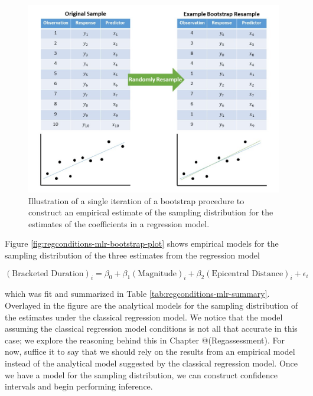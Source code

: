 \documentclass[]{book}
\theoremstyle{definition}
\theoremstyle{definition}
\theoremstyle{definition}
\theoremstyle{remark}
\begin{document}
\begin{figure}

{\centering \includegraphics[width=0.8\linewidth]{./images/RegConditions-Bootstrap} 

}

\caption{Illustration of a single iteration of a bootstrap procedure to construct an empirical estimate of the sampling distribution for the estimates of the coefficients in a regression model.}\label{fig:regconditions-bootstrap}
\end{figure}

Figure \ref{fig:regconditions-mlr-bootstrap-plot} shows empirical models
for the sampling distribution of the three estimates from the regression
model

\[(\text{Bracketed Duration})_i = \beta_0 + \beta_1(\text{Magnitude})_i + \beta_2(\text{Epicentral Distance})_i + \epsilon_i\]

which was fit and summarized in Table
\ref{tab:regconditions-mlr-summary}. Overlayed in the figure are the
analytical models for the sampling distribution of the estimates under
the classical regression model. We notice that the model assuming the
classical regression model conditions is not all that accurate in this
case; we explore the reasoning behind this in Chapter @(Regassessment).
For now, suffice it to say that we should rely on the results from an
empirical model instead of the analytical model suggested by the
classical regression model. Once we have a model for the sampling
distribution, we can construct confidence intervals and begin performing
inference.
\end{document}
